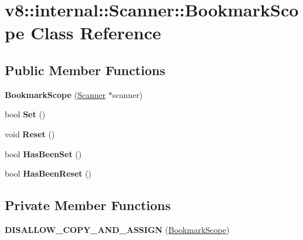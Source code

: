 \hypertarget{classv8_1_1internal_1_1_scanner_1_1_bookmark_scope}{}\section{v8\+:\+:internal\+:\+:Scanner\+:\+:Bookmark\+Scope Class Reference}
\label{classv8_1_1internal_1_1_scanner_1_1_bookmark_scope}
\subsection*{Public Member Functions}
\begin{DoxyCompactItemize}
\item 
{\bfseries Bookmark\+Scope} (\hyperlink{classv8_1_1internal_1_1_scanner}{Scanner} $\ast$scanner)\hypertarget{classv8_1_1internal_1_1_scanner_1_1_bookmark_scope_aa9b38a37e87dec3c1a80ca64c7a6ffcb}{}\label{classv8_1_1internal_1_1_scanner_1_1_bookmark_scope_aa9b38a37e87dec3c1a80ca64c7a6ffcb}

\item 
bool {\bfseries Set} ()\hypertarget{classv8_1_1internal_1_1_scanner_1_1_bookmark_scope_a211e990b375bf7b338919261a8197a36}{}\label{classv8_1_1internal_1_1_scanner_1_1_bookmark_scope_a211e990b375bf7b338919261a8197a36}

\item 
void {\bfseries Reset} ()\hypertarget{classv8_1_1internal_1_1_scanner_1_1_bookmark_scope_a15e4d69e1b4ac5979a4159e24068df86}{}\label{classv8_1_1internal_1_1_scanner_1_1_bookmark_scope_a15e4d69e1b4ac5979a4159e24068df86}

\item 
bool {\bfseries Has\+Been\+Set} ()\hypertarget{classv8_1_1internal_1_1_scanner_1_1_bookmark_scope_a959138fc6cd3add0afb8d76f9d7ec1b5}{}\label{classv8_1_1internal_1_1_scanner_1_1_bookmark_scope_a959138fc6cd3add0afb8d76f9d7ec1b5}

\item 
bool {\bfseries Has\+Been\+Reset} ()\hypertarget{classv8_1_1internal_1_1_scanner_1_1_bookmark_scope_a93d4389cced27f00a2ba4c9c619e1641}{}\label{classv8_1_1internal_1_1_scanner_1_1_bookmark_scope_a93d4389cced27f00a2ba4c9c619e1641}

\end{DoxyCompactItemize}
\subsection*{Private Member Functions}
\begin{DoxyCompactItemize}
\item 
{\bfseries D\+I\+S\+A\+L\+L\+O\+W\+\_\+\+C\+O\+P\+Y\+\_\+\+A\+N\+D\+\_\+\+A\+S\+S\+I\+GN} (\hyperlink{classv8_1_1internal_1_1_scanner_1_1_bookmark_scope}{Bookmark\+Scope})\hypertarget{classv8_1_1internal_1_1_scanner_1_1_bookmark_scope_a69fb249acd949dab9c6bf097025da8fc}{}\label{classv8_1_1internal_1_1_scanner_1_1_bookmark_scope_a69fb249acd949dab9c6bf097025da8fc}

\end{DoxyCompactItemize}
